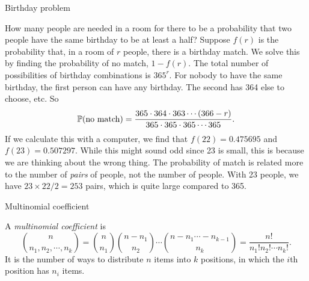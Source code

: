 %
\begin{note}
  \begin{field}
    Birthday problem
  \end{field}
  \begin{field}
    \begin{eg}
      How many people are needed in a room for there to be a probability that two people have the same birthday to be at least a half?
      Suppose $f(r)$ is the probability that, in a room of $r$ people, there is a birthday match.
      We solve this by finding the probability of no match, $1 - f(r)$. The total number of possibilities of birthday combinations is $365^r$. For nobody to have the same birthday, the first person can have any birthday. The second has 364 else to choose, etc. So
      \[
        \P(\text{no match}) = \frac{365\cdot 364\cdot 363 \cdots (366 - r)}{365\cdot 365\cdot 365 \cdots 365}.
      \]
      If we calculate this with a computer, we find that $f(22) = 0.475695$ and $f(23) = 0.507297$.
      While this might sound odd since 23 is small, this is because we are thinking about the wrong thing. The probability of match is related more to the number of \emph{pairs} of people, not the number of people. With 23 people, we have $23\times 22/2 = 253$ pairs, which is quite large compared to 365.
    \end{eg}
  \end{field}
  \xplain{}%
\end{note}

%
\begin{note}
  \begin{field}
    Multinomial coefficient
  \end{field}
  \begin{field}
    \begin{defi}
      A \emph{multinomial coefficient} is
      \[
        \binom{n}{n_1, n_2, \cdots, n_k} = \binom{n}{n_1}\binom{n - n_1}{n_2}\cdots \binom{n - n_1\cdots - n_{k - 1}}{n_k} = \frac{n!}{n_1!n_2!\cdots n_k!}.
      \]
      It is the number of ways to distribute $n$ items into $k$ positions, in which the $i$th position has $n_i$ items.
    \end{defi}
  \end{field}
  \xplain{}%
\end{note}

